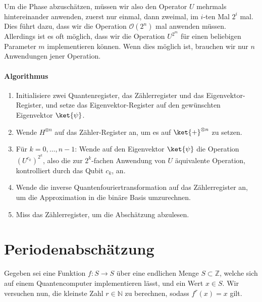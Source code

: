 Um die Phase abzuschätzen, müssen wir also den Operator $U$ mehrmals hintereinander anwenden, zuerst nur einmal, dann zweimal, im $i$-ten Mal $2^i$ mal. Dies führt dazu, dass wir die Operation $\mathcal O(2^n)$ mal anwenden müssen. Allerdings ist es oft möglich, dass wir die Operation $U^{2^m}$ für einen beliebigen Parameter $m$ implementieren können. Wenn dies möglich ist, brauchen wir nur $n$ Anwendungen jener Operation.

\paragraph{Algorithmus}
\begin{enumerate}
    \item Initialisiere zwei Quantenregister, das Zählerregister und das Eigenvektor-Register, und setze das Eigenvektor-Register auf den gewünschten Eigenvektor $\ket{\psi}$.
    \item Wende $H^{\otimes n}$ auf das Zähler-Register an, um es auf $\ket{+}^{\otimes n}$ zu setzen.
    \item Für $k = 0, \dots, n - 1$: Wende auf den Eigenvektor $\ket{\psi}$ die Operation $(U^{c_k})^{2^k}$, also die zur $2^k$-fachen Anwendung von $U$ äquivalente Operation, kontrolliert durch das Qubit $c_k$, an.
    \item Wende die inverse Quantenfouriertransformation auf das Zählerregister an, um die Approximation in die binäre Basis umzurechnen.
    \item Miss das Zählerregister, um die Abschätzung abzulesen.
\end{enumerate}
\paragraph{}

\paragraph{}

\section{Periodenabschätzung}
Gegeben sei eine Funktion $f : S \rightarrow S$ über eine endlichen Menge $S \subset \mathbb{Z}$, welche sich auf einem Quantencomputer implementieren lässt, und ein Wert $x \in S$. Wir versuchen nun, die kleinste Zahl $r \in \mathbb{N}$ zu berechnen, sodass $f^r(x) = x$ gilt.
